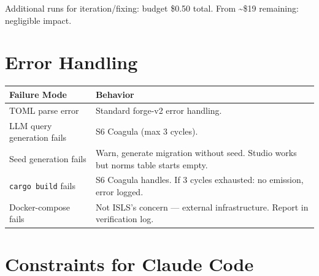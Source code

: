 \documentclass[11pt,a4paper]{article}
\begin{document}
Additional runs for iteration/fixing: budget \$0.50 total.
From \textasciitilde\$19 remaining: negligible impact.


\section{Error Handling}

\begin{longtable}{lp{10cm}}
\toprule
\textbf{Failure Mode} & \textbf{Behavior} \\
\midrule
TOML parse error & Standard forge-v2 error handling. \\
LLM query generation fails & S6 Coagula (max 3 cycles). \\
Seed generation fails & Warn, generate migration without seed.
  Studio works but norms table starts empty. \\
\texttt{cargo build} fails & S6 Coagula handles. If 3 cycles
  exhausted: no emission, error logged. \\
Docker-compose fails & Not ISLS's concern --- external
  infrastructure. Report in verification log. \\
\bottomrule
\end{longtable}


\section{Constraints for Claude Code}
\end{document}
